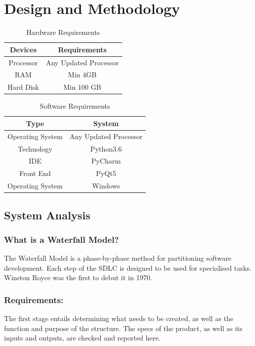 \chapter{Design and Methodology}


\begin{center}
\begin{table}
\centering
\begin{tabular}{ | c | c |}
 \hline
 \textbf{Devices} & \textbf{Requirements} \\ 
 \hline \hline
 Processor & Any Updated Processor \\ 
 RAM & Min 4GB \\  
 Hard Disk & Min 100 GB \\    
 \hline
\end{tabular}
\caption{Hardware Requirements}
\end{table}
\end{center}

\begin{center}
\begin{table}
\centering
\begin{tabular}{ | c | c |}
 \hline
 \textbf{Type} & \textbf{System} \\ 
 \hline \hline
 Operating System & Any Updated Processor \\ 
 Technology & Python3.6 \\  
 IDE & PyCharm \\    
 Front End & PyQt5 \\
 Operating System & Windows \\

 \hline
\end{tabular}
\caption{Software Requirements}
\end{table}
\end{center}


\section{System Analysis}
\subsection{What is a Waterfall Model?}
The Waterfall Model is a phase-by-phase method for partitioning software development. Each step of the SDLC is designed to be used for specialised tasks. Winston Royce was the first to debut it in 1970.
\subsection{Requirements:}
The first stage entails determining what needs to be created, as well as the function and purpose of the structure. The specs of the product, as well as its inputs and outputs, are checked and reported here.
